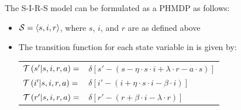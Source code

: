 The S-I-R-S model can be formulated as a PHMDP as follows:
\begin{itemize}
    \item {\footnotesize $ \mathcal{S} = \left\langle s, i, r \right\rangle$}, where $ s $, $ i $, and $ r $ are as defined above
    \item The transition function {\footnotesize \Transition} for each state variable in {\footnotesize \State} is given by:    \\
    {\footnotesize 
        \abovedisplayskip=5pt
        \belowdisplayskip=0pt
        \renewcommand{\arraystretch}{1.5}
        \begin{tabular}{ll}
            $ \mathcal{T}\left( s' | s, i, r, a \right) =$ & $ \delta \left[ s' - (s - \eta \cdot s \cdot i + \lambda \cdot r -a \cdot s) \right] $ \\
            $ \mathcal{T}\left( i' | s, i, r, a \right) =$ & $ \delta \left[ i' - (i + \eta \cdot s \cdot i - \beta \cdot i) \right] $ \\
            $ \mathcal{T}\left( r' | s, i, r, a \right) =$ & $ \delta \left[ r' - (r + \beta \cdot i - \lambda \cdot r) \right] $ \\            
        \end{tabular}
    }%
\end{itemize} 

